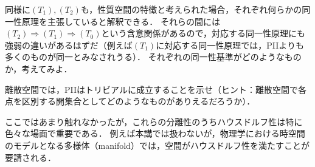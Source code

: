 \documentclass[11pt,a4paper, dvipdfmx]{jsarticle}
\begin{document}
\begin{exercise}
同様に$(T_1), (T_2)$も，性質空間の特徴と考えられた場合，それぞれ何らかの同一性原理を主張していると解釈できる．
それらの間には$(T_2) \Rightarrow (T_1) \Rightarrow (T_0)$という含意関係があるので，対応する同一性原理にも強弱の違いがあるはずだ（例えば$(T_1)$に対応する同一性原理では，PIIよりも多くのものが同一とみなされうる）．
それぞれの同一性基準がどのようなものか，考えてみよ．
\end{exercise}

\begin{exercise}
離散空間では，PIIはトリビアルに成立することを示せ（ヒント：離散空間で各点を区別する開集合としてどのようなものがありえるだろうか）．
\end{exercise}

\begin{develop}
ここではあまり触れなかったが，これらの分離性のうちハウスドルフ性は特に色々な場面で重要である．
例えば本講では扱わないが，物理学における時空間のモデルとなる多様体（manifold）では，空間がハウスドルフ性を満たすことが要請される．
\end{develop}








\end{document}
